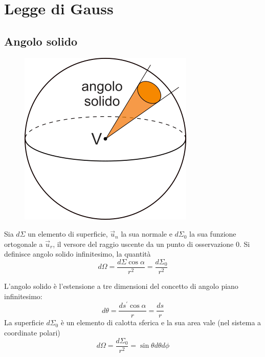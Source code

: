 \documentclass[class=book, crop=false, oneside, 12pt]{standalone}
\begin{document}
\chapter{Legge di Gauss}

\section{Angolo solido}

\begin{figure}[h]
    \includegraphics[scale=0.4]{angolo-solido}
    \centering
    \caption{}
\end{figure}

Sia \(d \Sigma\) un elemento di superficie, \(\overrightarrow{u}_n\) la sua normale e \(d \Sigma_0\) la sua funzione ortogonale a \(\overrightarrow{u}_r\), il versore del raggio uscente da un punto di osservazione \(0\). 
Si definisce angolo solido infinitesimo, la quantità
\begin{equation}
    d \Omega = \frac{d \Sigma \cos \alpha}{r^2} = \frac{d \Sigma_0}{r^2}
\end{equation}

L'angolo solido è l'estensione a tre dimensioni del concetto di angolo piano infinitesimo:
\begin{equation}
    d \theta = \frac{ds^{\prime} \cos \alpha}{r} = \frac{ds}{r}
\end{equation}
La superficie \(d \Sigma_0\) è un elemento di calotta sferica e la sua area vale (nel sistema a coordinate polari)
\begin{equation} \label{misura_infinitesimo_angolo_solido}
    d \Omega = \frac{d \Sigma_0}{r^2} = \sin \theta d \theta d \phi
\end{equation}
\end{document}
